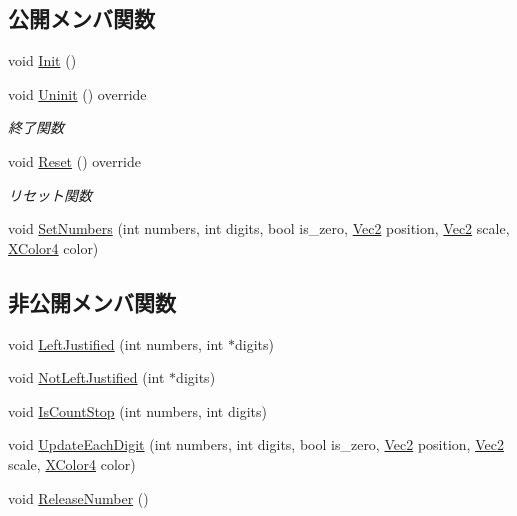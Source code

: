 \subsection*{公開メンバ関数}
\begin{DoxyCompactItemize}
\item 
void \mbox{\hyperlink{class_numbers_a42158aa8dbb71308161c642aed8752e8}{Init}} ()
\item 
void \mbox{\hyperlink{class_numbers_aeaad3cc1b8ae7defe79813b983b04101}{Uninit}} () override
\begin{DoxyCompactList}\small\item\em 終了関数 \end{DoxyCompactList}\item 
void \mbox{\hyperlink{class_numbers_a1ab67e439ba1695c8fd545dfc1650990}{Reset}} () override
\begin{DoxyCompactList}\small\item\em リセット関数 \end{DoxyCompactList}\item 
void \mbox{\hyperlink{class_numbers_aeb51ecf4e148f4ca67ac7788e061f94d}{Set\+Numbers}} (int numbers, int digits, bool is\+\_\+zero, \mbox{\hyperlink{_vector3_d_8h_a5ef6e95dfc5f9d3820b71772d99bbc25}{Vec2}} position, \mbox{\hyperlink{_vector3_d_8h_a5ef6e95dfc5f9d3820b71772d99bbc25}{Vec2}} scale, \mbox{\hyperlink{_vector3_d_8h_a680c30c4a07d86fe763c7e01169cd6cc}{X\+Color4}} color)
\end{DoxyCompactItemize}
\subsection*{非公開メンバ関数}
\begin{DoxyCompactItemize}
\item 
void \mbox{\hyperlink{class_numbers_af4a06e0dd7dece56d60098837aae5aa5}{Left\+Justified}} (int numbers, int $\ast$digits)
\item 
void \mbox{\hyperlink{class_numbers_a1aaad1f057da0064766bfd25d57caa17}{Not\+Left\+Justified}} (int $\ast$digits)
\item 
void \mbox{\hyperlink{class_numbers_ab172b8637d38b710a4ff6dd3808522e0}{Is\+Count\+Stop}} (int numbers, int digits)
\item 
void \mbox{\hyperlink{class_numbers_a629383f243c0aeb25bf9e8d067e965a2}{Update\+Each\+Digit}} (int numbers, int digits, bool is\+\_\+zero, \mbox{\hyperlink{_vector3_d_8h_a5ef6e95dfc5f9d3820b71772d99bbc25}{Vec2}} position, \mbox{\hyperlink{_vector3_d_8h_a5ef6e95dfc5f9d3820b71772d99bbc25}{Vec2}} scale, \mbox{\hyperlink{_vector3_d_8h_a680c30c4a07d86fe763c7e01169cd6cc}{X\+Color4}} color)
\item 
void \mbox{\hyperlink{class_numbers_a1eb0843ca2449c52e21c84b96bfa4dc5}{Release\+Number}} ()
\end{DoxyCompactItemize}
